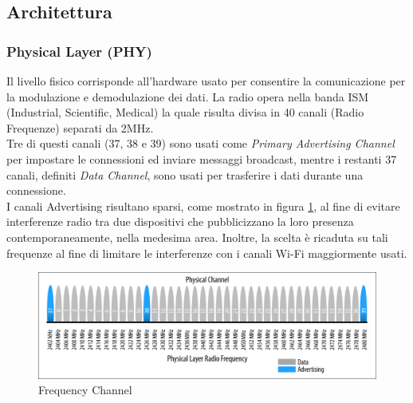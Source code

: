 \subsection{Architettura}
\subsubsection{Physical Layer (PHY)}
Il livello fisico corrisponde all'hardware usato per consentire la comunicazione per la modulazione e demodulazione dei dati. La radio opera nella banda ISM (Industrial, Scientific, Medical) la quale risulta divisa in 40 canali (Radio Frequenze) separati da 2MHz.\\
Tre di questi canali (37, 38 e 39) sono usati come \textit{Primary Advertising Channel} per impostare le connessioni ed inviare messaggi broadcast, mentre i restanti 37 canali, definiti \textit{Data Channel}, sono usati per trasferire i dati durante una connessione.\\

\noindent I canali Advertising risultano sparsi, come mostrato in figura \ref{fig:frequency_channel}, al fine di evitare interferenze radio tra due dispositivi che pubblicizzano la loro presenza contemporaneamente, nella medesima area. Inoltre, la scelta è ricaduta su tali frequenze al fine di limitare le interferenze con i canali Wi-Fi maggiormente usati.

\begin{figure}[!ht]
    \centering
    \includegraphics[width = \textwidth]{images/Physical Channel BLE.png}
    \caption{Frequency Channel}
    \label{fig:frequency_channel}
\end{figure}

